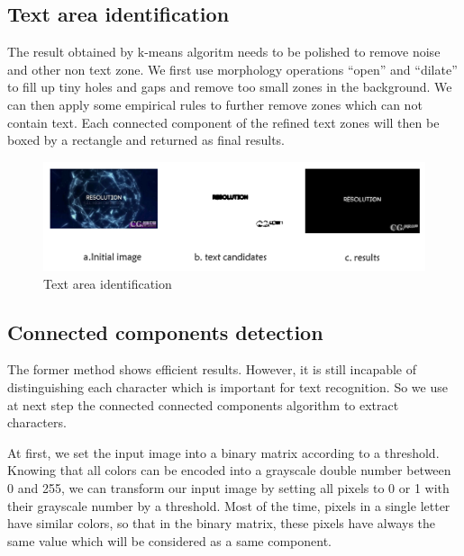 \documentclass[paper=a4, french, 11pt]{scrartcl}
\begin{document}
\subsection{Text area identification} \mbox{} \vspace{-0.5cm}

The result obtained by k-means algoritm needs to be polished to remove noise and other non text zone. We first use morphology operations “open” and “dilate” to fill up tiny holes and gaps and remove too small zones in the background. We can then apply some empirical rules to further remove zones which can not contain text. Each connected component of the refined text zones will then be boxed by a rectangle and returned as final results.

\begin{figure}[h]
\begin{center}
   \includegraphics[width=0.9\linewidth]{text_area_example.png}
\end{center}
\vspace{-4ex}
\caption{Text area identification}
\label{fig:heatmap}
\end{figure}

\subsection{Connected components detection} \mbox{} \vspace{-0.5cm}

The former method shows efficient results. However, it is still incapable of distinguishing each character which is important for text recognition. So we use at next step the connected connected components algorithm to extract characters.

At first, we set the input image into a binary matrix according to a threshold. Knowing that all colors can be encoded into a grayscale double number between 0 and 255, we can transform our input image by setting all pixels to 0 or 1 with their grayscale number by a threshold. Most of the time, pixels in a single letter have similar colors, so that in the binary matrix, these pixels have always the same value which will be considered as a same component.
\end{document}
